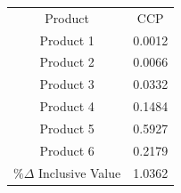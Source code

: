 \begin{tabular}{cc}
Product & CCP \\
Product 1 & 0.0012 \\
Product 2 & 0.0066 \\
Product 3 & 0.0332 \\
Product 4 & 0.1484 \\
Product 5 & 0.5927 \\
Product 6 & 0.2179 \\
$\%\Delta$ Inclusive Value & 1.0362 \\
\end{tabular}